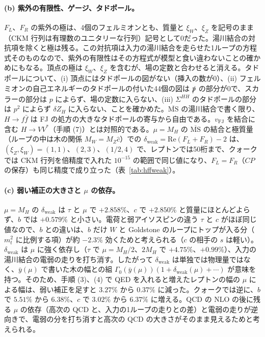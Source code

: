 \documentclass[a4paper,10pt]{ltjsarticle}
\newcommand{\MSbar}{\overline{\mathrm{MS}}}
\begin{document}
\paragraph{(b) 紫外の有限性、ゲージ、タドポール。}$F_L$、$F_R$ の紫外の極は、4個のフェルミオンとも、質量と $\xi_W$、$\xi_Z$ を記号のまま（CKM 行列は有理数のユニタリーな行列）記号として0だった。湯川結合の対抗項を除くと極は残る。この対抗項は入力の湯川結合を走らせた1ループの方程式そのものなので、紫外の有限性はその方程式が模型と食い違わないことの確かめにもなる。頂点の極は $\xi_W$、$\xi_Z$ を含むが、場の定数と合わせると消える。タドポールについて、(i) 頂点にはタドポールの図がない（挿入の数が0）、(ii) フェルミオンの自己エネルギーのタドポールの付いた44個の図は $\slashed p$ の部分が0で、スカラーの部分は $p$ によらず、場の定数に入らない、(iii) $\Sigma^{HH}$ のタドポールの部分は $p^2$ によらず $\delta Z_H$ に入らない、ことを確かめた。$\MSbar$ の湯川結合で書く限り、$H\to f\bar f$ は FJ の処方の大きなタドポールの寄与から自由である。$v_{\mathrm{FJ}}$ を結合に含む $H\to VV^*$（手順 (7)）とは対照的である。$\mu=M_H$ の $\MSbar$ の結合と極質量（ループの中は木の関係 $M_W=M_Z\hat c$）での $\delta_{\mathrm{weak}}=\mathrm{Re}(F_L+F_R)-2$ は、$(\xi_Z,\xi_W)=(1,1)$、$(2,3)$、$(1/2,4)$ で、レプトンでは50桁まで、クォークでは CKM 行列を倍精度で入れた $10^{-15}$ の範囲で同じ値になり、$F_L=F_R$（$CP$ の保存）も同じ精度で成り立った（表~\ref{tab:hffweak}）。

\paragraph{(c) 弱い補正の大きさと $\mu$ の依存。}$\mu=M_H$ の $\delta_{\mathrm{weak}}$ は $\tau$ と $\mu$ で $+2.858\%$、$c$ で $+2.850\%$ と質量にほとんどよらず、$b$ では $+0.579\%$ と小さい。電荷と弱アイソスピンの違う $\tau$ と $c$ がほぼ同じ値なので、$b$ との違いは、$b$ だけ $W$ と Goldstone のループにトップが入る分（$m_t^2$ に比例する項）が約 $-2.3\%$ 効くためと考えられる（$c$ の相手の $s$ は軽い）。$\delta_{\mathrm{weak}}$ は $\mu$ に強く依存し（$\tau$ で $\mu=M_H/2$、$2M_H$ で $+4.75\%$、$+0.99\%$）、入力の湯川結合の電弱の走りを打ち消す。したがって $\delta_{\mathrm{weak}}$ は単独では物理量ではなく、$\bar y(\mu)$ で書いた木の幅との組 $\Gamma_0(\bar y(\mu))(1+\delta_{\mathrm{weak}}(\mu)+\cdots)$ が意味を持つ。そのため、手順 (3)、(4) で QED を入れると増えたレプトンの幅の $\mu$ による幅は、弱い補正を足すと $3.27\%$ から $0.37\%$ に減った。クォークでは逆に、$b$ で $5.51\%$ から $6.38\%$、$c$ で $3.02\%$ から $6.37\%$ に増える。QCD の NLO の後に残る $\mu$ の依存（高次の QCD と、入力の1ループの走りとの差）と電弱の走りが逆向きで、電弱の分を打ち消すと高次の QCD の大きさがそのまま見えるためと考えられる。
\end{document}
